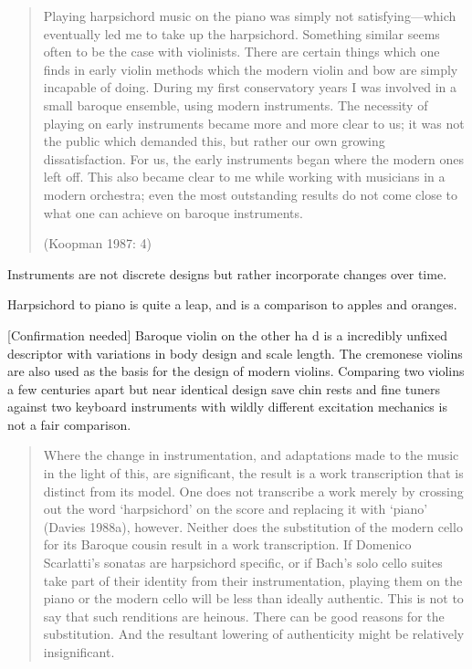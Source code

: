\begin{quotation}
Playing harpsichord music on the piano was simply not satisfying—which
eventually led me to take up the harpsichord. Something similar seems often to
be the case with violinists. There are certain things which one finds in early
violin methods which the modern violin and bow are simply incapable of doing.
During my first conservatory years I was involved in a small baroque ensemble,
using modern instruments. The necessity of playing on early instruments became
more and more clear to us; it was not the public which demanded this, but rather
our own growing dissatisfaction. For us, the early instruments began where the
modern ones left off. This also became clear to me while working with musicians
in a modern orchestra; even the most outstanding results do not come close to
what one can achieve on baroque instruments.

(Koopman 1987: 4)
\end{quotation}


Instruments are not discrete designs but rather incorporate changes over time. 

Harpsichord to piano is quite a leap, and is a comparison to apples and oranges.

[Confirmation needed] Baroque violin on the other ha d is a incredibly unfixed
descriptor with variations in body design and scale length. The cremonese
violins are also used as the basis for the design of modern violins. Comparing
two violins a few centuries apart but near identical design save chin rests and
fine tuners against two keyboard instruments with wildly different excitation
mechanics is not a fair comparison. 

\begin{quotation}
Where the change in instrumentation, and adaptations made to the music in the
light of this, are significant, the result is a work transcription that is
distinct from its model. One does not transcribe a work merely by crossing out
the word ‘harpsichord’ on the score and replacing it with ‘piano’ (Davies
1988a), however. Neither does the substitution of the modern cello for its
Baroque cousin result in a work transcription. If Domenico Scarlatti's sonatas
are harpsichord specific, or if Bach's solo cello suites take part of their
identity from their instrumentation, playing them on the piano or the modern
cello will be less than ideally authentic. This is not to say that such
renditions are heinous. There can be good reasons for the substitution. And the
resultant lowering of authenticity might be relatively insignificant.
\end{quotation}


